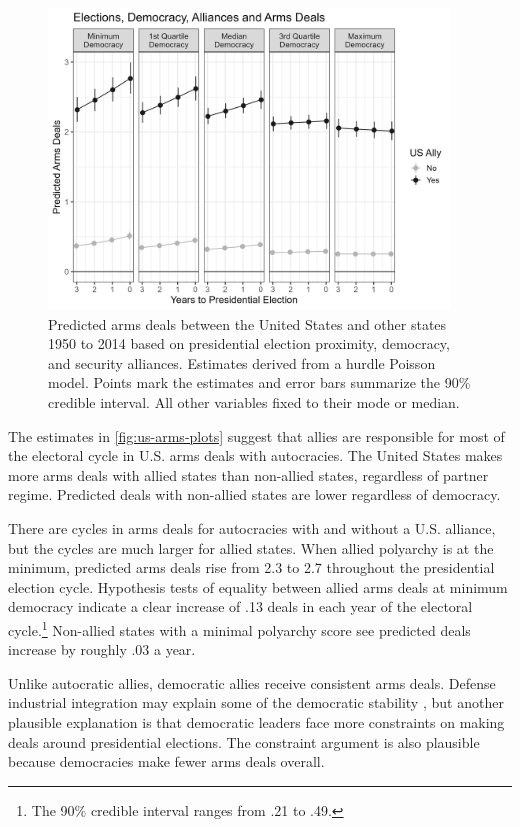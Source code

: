 \documentclass[12pt]{article}
\begin{document}
\begin{figure}[htpb]
	\centering
		\includegraphics[width=0.95\textwidth]{../figures/us-arms-plots.png}
	\caption{Predicted arms deals between the United States and other states 1950 to 2014 based on presidential election proximity, democracy, and security alliances. Estimates derived from a hurdle Poisson model. Points mark the estimates and error bars summarize the 90\% credible interval. All other variables fixed to their mode or median.}
	\label{fig:us-arms-plots}
\end{figure}


The estimates in \autoref{fig:us-arms-plots} suggest that allies are responsible for most of the electoral cycle in U.S. arms deals with autocracies. 
The United States makes more arms deals with allied states than non-allied states, regardless of partner regime. 
Predicted deals with non-allied states are lower regardless of democracy. 


There are cycles in arms deals for autocracies with and without a U.S. alliance, but the cycles are much larger for allied states. 
When allied polyarchy is at the minimum, predicted arms deals rise from 2.3 to 2.7 throughout the presidential election cycle.
Hypothesis tests of equality between allied arms deals at minimum democracy indicate a clear increase of .13 deals in each year of the electoral cycle.\footnote{The 90\% credible interval ranges from .21 to .49.}
Non-allied states with a minimal polyarchy score see predicted deals increase by roughly .03 a year.


Unlike autocratic allies, democratic allies receive consistent arms deals. 
Defense industrial integration may explain some of the democratic stability \citep{Brooks2005}, but another plausible explanation is that democratic leaders face more constraints on making deals around presidential elections.
The constraint argument is also plausible because democracies make fewer arms deals overall. 
\end{document}
